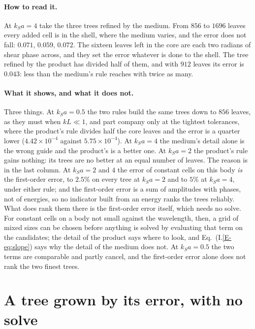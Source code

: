 \documentclass[11pt,a4paper]{article}
\begin{document}
\paragraph{How to read it.} At $k_Sa=4$ take the three trees refined by the medium. From $856$ to $1696$ leaves
every added cell is in the shell, where the medium varies, and the error does not fall: $0.071$, $0.059$,
$0.072$. The sixteen leaves left in the core are each two radians of shear phase across, and they set the
error whatever is done to the shell. The tree refined by the product has divided half of them, and with
$912$ leaves its error is $0.043$: less than the medium's rule reaches with twice as many.

\paragraph{What it shows, and what it does not.} Three things. At $k_Sa=0.5$ the two rules build the same
trees down to $856$ leaves, as they must when $kL\ll1$, and part company only at the tightest
tolerances, where the product's rule divides half the core leaves and the error is a quarter lower
($4.42\times10^{-4}$ against $5.75\times10^{-4}$). At $k_Sa=4$ the medium's detail alone is the wrong
guide and the product's is a better one. At $k_Sa=2$ the product's rule gains nothing: its trees are no
better at an equal number of leaves. The reason is in the last column. At $k_Sa=2$ and $4$ the error of
constant cells on this body \emph{is} the first-order error, to $2.5\%$ on every tree at $k_Sa=2$ and to
$5\%$ at $k_Sa=4$, under either rule; and the first-order error is a sum of amplitudes with phases, not
of energies, so no indicator built from an energy ranks the trees reliably. What does rank them there is
the first-order error itself, which needs no solve. For constant cells on a body not small against the
wavelength, then, a grid of mixed sizes can be chosen before anything is solved by evaluating that term
on the candidates; the detail of the product says where to look, and Eq.~(I.\ref{E-eq:slope}) says why the
detail of the medium does not. At $k_Sa=0.5$ the two terms are comparable and partly cancel, and the
first-order error alone does not rank the two finest trees.

\section{A tree grown by its error, with no solve}\label{sec:grown}
\end{document}
